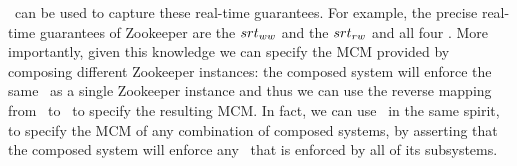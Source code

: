 \Srts\ can be used to capture these real-time guarantees. For example, the precise real-time guarantees of Zookeeper are the $srt_{ww}$ and the $srt_{rw}$ \srts and all four \prts.
More importantly, given this knowledge we can specify the MCM provided by composing different Zookeeper instances: the composed system will enforce the same \rts\ as a single Zookeeper instance and thus we can use the reverse mapping from \rts\ to \synpats\ to specify the resulting MCM. In fact, we can use \srts\ in the same spirit, to specify the MCM of any combination of composed systems, by asserting that the composed system will enforce any \rt\ that is enforced by all of its subsystems.






